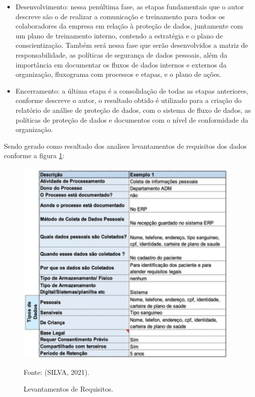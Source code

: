 \documentclass[
	12pt,				%
	openright,			%
	oneside,			%
	a4paper,			%
	english,			%
	french,				%
	spanish,			%
	brazil,				%
	]{abntex2}
\begin{document}
\begin{itemize}
\item Desenvolvimento: nessa penúltima fase, as etapas fundamentais que o autor descreve são o de realizar a comunicação e treinamento para todos os colaboradores da empresa em relação à proteção de dados, juntamente com um plano de treinamento interno, contendo a estratégia e o plano de conscientização. Também será nessa fase que serão desenvolvidos a matriz de responsabilidade, as políticas de segurança de dados pessoais, além da importância em documentar os fluxos de dados internos e externos da organização, fluxograma com processos e etapas, e o plano de ações.
\item Encerramento: a última etapa é a consolidação de todas as etapas anteriores, conforme descreve o autor, o resultado obtido é utilizado para a criação do relatório de análise de proteção de dados, com o sistema de fluxo de dados, as políticas de proteção de dados e documentos com o nível de conformidade da organização.
\end{itemize}

Sendo gerado como resultado dos analises levantamentos de requisitos dos dados conforme a figura \ref{fig: silva21A}:

\begin{figure}[ht]
    \centering
    \caption{Levantamentos de Requisitos.}
    \includegraphics[width=4.3in]{Images/16Silva2021.png}
    \label{fig: silva21A}
    
    \centering \small Fonte: (SILVA, 2021).
\end{figure}

\pagebreak
\end{document}
